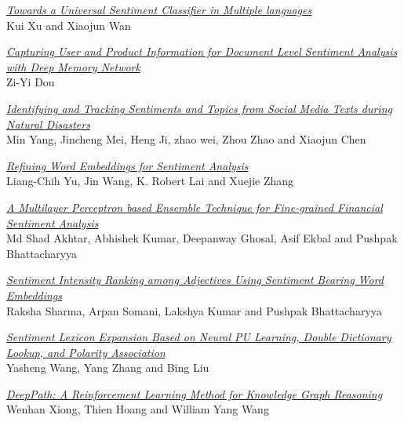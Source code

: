 \hyperlink{page.520}{\em Towards a Universal Sentiment Classifier in Multiple languages}\samepage \\
\hspace*{7mm} Kui Xu and Xiaojun Wan\dotfill {}

\hyperlink{page.530}{\em Capturing User and Product Information for Document Level Sentiment Analysis with Deep Memory Network}\samepage \\
\hspace*{7mm} Zi-Yi Dou\dotfill {}

\hyperlink{page.536}{\em Identifying and Tracking Sentiments and Topics from Social Media Texts during Natural Disasters}\samepage \\
\hspace*{7mm} Min Yang, Jincheng Mei, Heng Ji, zhao wei, Zhou Zhao and Xiaojun Chen\dotfill {}

\hyperlink{page.543}{\em Refining Word Embeddings for Sentiment Analysis}\samepage \\
\hspace*{7mm} Liang-Chih Yu, Jin Wang, K. Robert Lai and Xuejie Zhang\dotfill {}

\hyperlink{page.549}{\em A Multilayer Perceptron based Ensemble Technique for Fine-grained Financial Sentiment Analysis}\samepage \\
\hspace*{7mm} Md Shad Akhtar, Abhishek Kumar, Deepanway Ghosal, Asif Ekbal and Pushpak Bhattacharyya\dotfill {}

\hyperlink{page.556}{\em Sentiment Intensity Ranking among Adjectives Using Sentiment Bearing Word Embeddings}\samepage \\
\hspace*{7mm} Raksha Sharma, Arpan Somani, Lakshya Kumar and Pushpak Bhattacharyya\dotfill {}

\hyperlink{page.562}{\em Sentiment Lexicon Expansion Based on Neural PU Learning, Double Dictionary Lookup, and Polarity Association}\samepage \\
\hspace*{7mm} Yasheng Wang, Yang Zhang and Bing Liu\dotfill {}

\hyperlink{page.573}{\em DeepPath: A Reinforcement Learning Method for Knowledge Graph Reasoning}\samepage \\
\hspace*{7mm} Wenhan Xiong, Thien Hoang and William Yang Wang\dotfill {}

